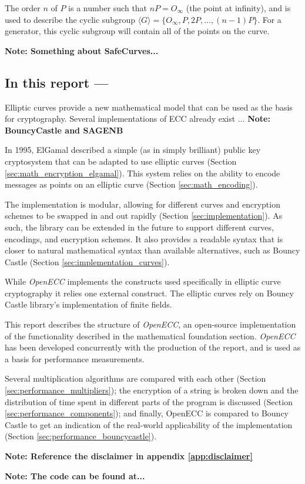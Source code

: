 The order \(n\) of \(P\) is a number such that \(nP = O_{\infty}\) (the point at infinity), and is used to describe
the cyclic subgroup \(\langle G \rangle = \{ O_\infty, P, 2P, ..., (n-1)P \} \). For a generator, this cyclic subgroup
will contain all of the points on the curve.


\textbf{Note: Something about SafeCurves...}

\subsection{In this report ---}

Elliptic curves provide a new mathematical model that can be used as the basis for cryptography. Several
implementations of ECC already exist ... \textbf{Note: BouncyCastle and SAGENB}

In 1995, ElGamal described a simple (as in simply brilliant) public key cryptosystem that can be adapted
to use elliptic curves (Section \ref{sec:math_encryption_elgamal}). This system relies on the ability to
encode messages as points on an elliptic curve (Section \ref{sec:math_encoding}).

The implementation is modular, allowing for different curves and encryption schemes to be swapped in and out
rapidly (Section \ref{sec:implementation}). As such, the library can be extended in the future to support different
curves, encodings, and encryption schemes. It also provides a readable syntax that is closer to natural mathematical
syntax than available alternatives, such as Bouncy Castle (Section \ref{sec:implementation_curves}).

While \emph{OpenECC} implements the constructs used specifically in elliptic curve cryptography it relies one external construct.
The elliptic curves rely on Bouncy Castle library's implementation of finite fields.

This report describes the structure of \emph{OpenECC}, an open-source implementation of the functionality
described in the mathematical foundation section. \emph{OpenECC} has been developed concurrently with the
production of the report, and is used as a basis for performance measurements.

Several multiplication algorithms are compared with each other (Section \ref{sec:performance_multipliers});
the encryption of a string is broken down and the distribution of time spent in different parts of the program
is discussed (Section \ref{sec:performance_components}); and finally, OpenECC is compared to Bouncy Castle to
get an indication of the real-world applicability of the implementation (Section \ref{sec:performance_bouncycastle}).

\textbf{Note: Reference the disclaimer in appendix \ref{app:disclaimer}}

\textbf{Note: The code can be found at...}